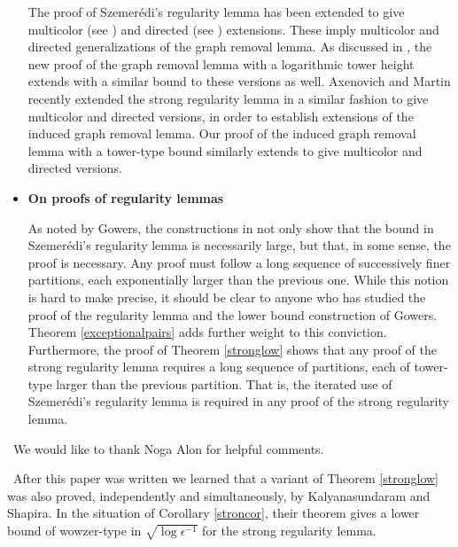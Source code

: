 \documentclass[11pt]{article}
\begin{document}
\begin{itemize}
The proof of Szemer\'edi's regularity lemma has been extended to give
multicolor (see \cite{KoSi}) and directed (see \cite{AlSh04}) extensions. These
imply multicolor and directed generalizations of the graph removal lemma. As
discussed in \cite{Fo}, the new proof of the graph removal lemma with a
logarithmic tower height extends with a similar bound to these versions as
well. Axenovich and Martin \cite{AxMa} recently extended the strong regularity
lemma in a similar fashion to give multicolor and directed versions, in order
to establish extensions of the induced graph removal lemma.  Our proof of the
induced graph removal lemma with a tower-type bound similarly extends to give
multicolor and directed versions.

\item {\bf On proofs of regularity lemmas}

As noted by Gowers, the constructions in \cite{Go} not only show that the bound
in Szemer\'edi's regularity lemma is necessarily large, but that, in some
sense, the proof is necessary. Any proof must follow a long sequence of
successively finer partitions, each exponentially larger than the previous one.
While this notion is hard to make precise, it should be clear to anyone who has studied
the proof of the regularity lemma and the lower bound construction of Gowers.
Theorem \ref{exceptionalpairs} adds further weight to this conviction. Furthermore, the proof of Theorem \ref{stronglow} shows that any proof of the strong regularity lemma requires a long sequence of partitions, each of tower-type larger than the previous partition. That is, the
iterated use of Szemer\'edi's regularity lemma is required in any proof of the
strong regularity lemma.
\end{itemize}

\vspace{0.1cm}  \, We would like to thank Noga Alon for helpful comments.

\vspace{0.1cm} \, After this paper was
written we learned that a variant of Theorem \ref{stronglow} was also proved,
independently and simultaneously, by Kalyanasundaram and Shapira. In the
situation of Corollary \ref{stroncor}, their theorem gives a lower bound of
wowzer-type in $\sqrt{\log \epsilon^{-1}}$ for the strong regularity lemma.
\end{document}
